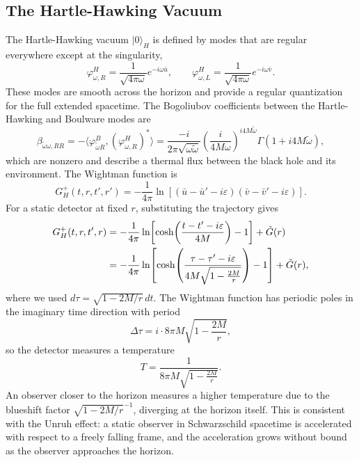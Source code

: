 \subsection*{The Hartle-Hawking Vacuum}

The Hartle-Hawking vacuum $|0\rangle_H$ is defined by modes that are
regular everywhere except at the singularity,
\begin{equation}
    \varphi^H_{\omega,R} = \frac{1}{\sqrt{4\pi\omega}}e^{-i\omega\bar u},
    \qquad
    \varphi^H_{\omega,L} = \frac{1}{\sqrt{4\pi\omega}}e^{-i\omega\bar v}.
\end{equation}
These modes are smooth across the horizon and provide a regular
quantization for the full extended spacetime. The Bogoliubov
coefficients between the Hartle-Hawking and Boulware modes are
\begin{equation}
    \beta_{\tilde\omega\omega,RR}
    = -\langle\varphi^B_{\tilde\omega R},
    (\varphi^H_{\omega,R})^*\rangle
    = \frac{-i}{2\pi\sqrt{\omega\tilde\omega}}
    \left(\frac{i}{4M\omega}\right)^{i4M\tilde\omega}
    \Gamma(1+i4M\tilde\omega),
\end{equation}
which are nonzero and describe a thermal flux between the black hole
and its environment. The Wightman function is
\begin{equation}
    G^+_H(t,r,t',r')
    = -\frac{1}{4\pi}\ln\left[
    (\bar u-\bar u'-i\varepsilon)
    (\bar v-\bar v'-i\varepsilon)\right].
\end{equation}
For a static detector at fixed $r$, substituting the trajectory gives
\begin{align}
    G^+_H(t,r,t',r)
    &= -\frac{1}{4\pi}\ln\!\left[
    \cosh\!\left(\frac{t-t'-i\varepsilon}{4M}\right) - 1\right]
    + \tilde G(r) \notag\\
    &= -\frac{1}{4\pi}\ln\!\left[
    \cosh\!\left(\frac{\tau-\tau'-i\varepsilon}
    {4M\sqrt{1-\frac{2M}{r}}}\right) - 1\right]
    + \tilde G(r),
\end{align}
where we used $d\tau = \sqrt{1-2M/r}\,dt$. The Wightman function has
periodic poles in the imaginary time direction with period
\begin{equation}
    \Delta\tau = i\cdot 8\pi M\sqrt{1-\frac{2M}{r}},
\end{equation}
so the detector measures a temperature
\begin{equation}
    T = \frac{1}{8\pi M\sqrt{1-\frac{2M}{r}}}.
\end{equation}
An observer closer to the horizon measures a higher temperature due to
the blueshift factor $\sqrt{1-2M/r}^{-1}$, diverging at the horizon
itself. This is consistent with the Unruh effect: a static observer in
Schwarzschild spacetime is accelerated with respect to a freely falling
frame, and the acceleration grows without bound as the observer
approaches the horizon.

